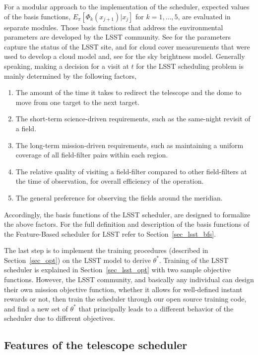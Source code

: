 \documentclass[12pt]{aastex62}
\theoremstyle{definition}
\begin{document}
For a modular approach to the implementation of the scheduler, expected values of the basis functions, $E_{\pi}[\Phi_k(x_{j+1})|x_j]$ for $k=1,\dots, 5$, are evaluated in separate modules. Those basis functions that address the environmental parameters are developed by the LSST community. See \citep{2014SPIE.9145E..1AG} for the parameters capture the status of the LSST site, \citep{sebag2008lsst} and \citep{sebag2007lsst} for cloud cover measurements that were used to develop a cloud model and, see \citep{yoachim2016optical} for the sky brightness model. Generally speaking, making a decision for a visit at $t$ for the LSST scheduling problem is mainly determined by the following factors,

\begin{enumerate}
\item The amount of the time it takes to redirect the telescope and the dome to move from one target to the next target.
\item The short-term science-driven requirements, such as the same-night revisit of a field.
\item The long-term mission-driven requirements, such as maintaining a uniform coverage of all field-filter pairs within each region.
\item The relative quality of visiting a field-filter compared to other field-filters at the time of observation, for overall efficiency of the operation.
\item The general preference for observing the fields around the meridian.
\end{enumerate}

Accordingly, the basis functions of the LSST scheduler, are designed to formalize the above factors. For the full definition and description of the basis functions of the Feature-Based scheduler for LSST refer to Section~\ref{sec_lsst_bfs}.

The last step is to implement the training procedures (described in Section~\ref{sec_opt}) on the LSST model to derive $\theta^*$. Training of the LSST scheduler is explained in Section~\ref{sec_lsst_opt} with two sample objective functions. However, the LSST community, and basically any individual can design their own mission objective function, whether it allows for well-defined instant rewards or not, then train the scheduler through our open source training code, and find a new set of $\theta^*$ that principally leads to a different behavior of the scheduler due to different objectives.


\subsection{Features of the telescope scheduler}\label{sec_lsst_features}
\end{document}
